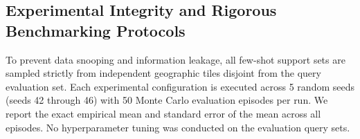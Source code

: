 \subsection{Experimental Integrity and Rigorous Benchmarking Protocols}
To prevent data snooping and information leakage, all few-shot support sets are sampled strictly from independent geographic tiles disjoint from the query evaluation set. Each experimental configuration is executed across 5 random seeds (seeds 42 through 46) with 50 Monte Carlo evaluation episodes per run. We report the exact empirical mean and standard error of the mean across all episodes. No hyperparameter tuning was conducted on the evaluation query sets.

